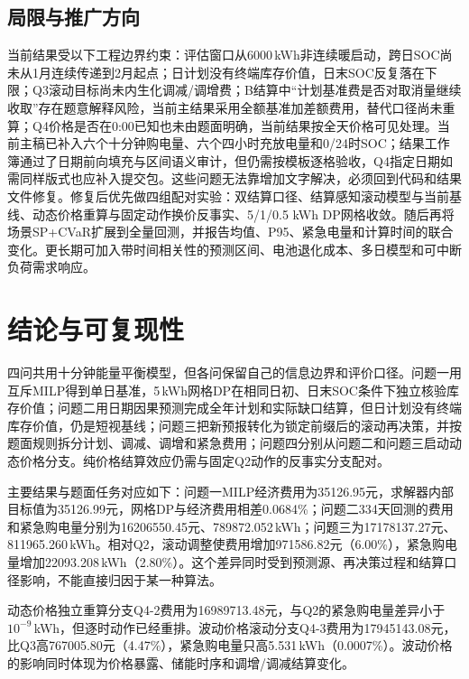 \documentclass[UTF8,12pt,a4paper]{ctexart}
\begin{document}
\subsection{局限与推广方向}
当前结果受以下工程边界约束：评估窗口从6000\,kWh非连续暖启动，跨日SOC尚未从1月连续传递到2月起点；日计划没有终端库存价值，日末SOC反复落在下限；Q3滚动目标尚未内生化调减/调增费；B结算中“计划基准费是否对取消量继续收取”存在题意解释风险，当前主结果采用全额基准加差额费用，替代口径尚未重算；Q4价格是否在0:00已知也未由题面明确，当前结果按全天价格可见处理。当前主稿已补入六个十分钟购电量、六个四小时充放电量和0/24时SOC；结果工作簿通过了日期前向填充与区间语义审计，但仍需按模板逐格验收，Q4指定日期如需同样版式也应补入提交包。这些问题无法靠增加文字解决，必须回到代码和结果文件修复。修复后优先做四组配对实验：双结算口径、结算感知滚动模型与当前基线、动态价格重算与固定动作换价反事实、5/1/0.5 kWh DP网格收敛。随后再将场景SP+CVaR扩展到全量回测，并报告均值、P95、紧急电量和计算时间的联合变化。更长期可加入带时间相关性的预测区间、电池退化成本、多日模型和可中断负荷需求响应。

\section{结论与可复现性}
四问共用十分钟能量平衡模型，但各问保留自己的信息边界和评价口径。问题一用互斥MILP得到单日基准，5\,kWh网格DP在相同日初、日末SOC条件下独立核验库存价值；问题二用日期因果预测完成全年计划和实际缺口结算，但日计划没有终端库存价值，仍是短视基线；问题三把新预报转化为锁定前缀后的滚动再决策，并按题面规则拆分计划、调减、调增和紧急费用；问题四分别从问题二和问题三启动动态价格分支。纯价格结算效应仍需与固定Q2动作的反事实分支配对。

主要结果与题面任务对应如下：问题一MILP经济费用为35126.95元，求解器内部目标值为35126.99元，网格DP与经济费用相差0.0684\%；问题二334天回测的费用和紧急购电量分别为16206550.45元、789872.052\,kWh；问题三为17178137.27元、811965.260\,kWh。相对Q2，滚动调整使费用增加971586.82元（6.00\%），紧急购电量增加22093.208\,kWh（2.80\%）。这个差异同时受到预测源、再决策过程和结算口径影响，不能直接归因于某一种算法。

动态价格独立重算分支Q4-2费用为16989713.48元，与Q2的紧急购电量差异小于$10^{-9}$\,kWh，但逐时动作已经重排。波动价格滚动分支Q4-3费用为17945143.08元，比Q3高767005.80元（4.47\%），紧急购电量只高5.531\,kWh（0.0007\%）。波动价格的影响同时体现为价格暴露、储能时序和调增/调减结算变化。
\end{document}
